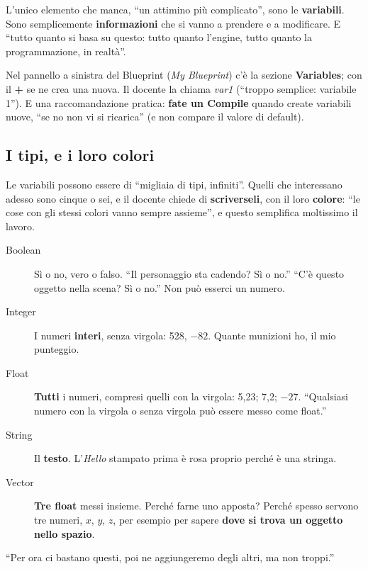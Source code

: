 L'unico elemento che manca, ``un attimino più complicato'', sono le
\textbf{variabili}. Sono semplicemente \textbf{informazioni} che si vanno a
prendere e a modificare. E ``tutto quanto si basa su questo: tutto quanto
l'engine, tutto quanto la programmazione, in realtà''.

Nel pannello a sinistra del Blueprint (\emph{My Blueprint}) c'è la sezione
\textbf{Variables}; con il \textbf{+} se ne crea una nuova. Il docente la
chiama \emph{var1} (``troppo semplice: variabile 1''). E una
raccomandazione pratica: \textbf{fate un Compile} quando create variabili
nuove, ``se no non vi si ricarica'' (e non compare il valore di default).

\subsection{I tipi, e i loro colori}

Le variabili possono essere di ``migliaia di tipi, infiniti''. Quelli che
interessano adesso sono cinque o sei, e il docente chiede di
\textbf{scriverseli}, con il loro \textbf{colore}: ``le cose con gli stessi
colori vanno sempre assieme'', e questo semplifica moltissimo il lavoro.

\begin{description}
  \item[Boolean] Sì o no, vero o falso. ``Il personaggio sta cadendo? Sì o
        no.'' ``C'è questo oggetto nella scena? Sì o no.'' Non può esserci un
        numero.
  \item[Integer] I numeri \textbf{interi}, senza virgola: 528, $-82$. Quante
        munizioni ho, il mio punteggio.
  \item[Float] \textbf{Tutti} i numeri, compresi quelli con la virgola: 5,23;
        7,2; $-27$. ``Qualsiasi numero con la virgola o senza virgola può
        essere messo come float.''
  \item[String] Il \textbf{testo}. L'\emph{Hello} stampato prima è rosa
        proprio perché è una stringa.
  \item[Vector] \textbf{Tre float} messi insieme. Perché farne uno apposta?
        Perché spesso servono tre numeri, $x$, $y$, $z$, per esempio per
        sapere \textbf{dove si trova un oggetto nello spazio}.
\end{description}
``Per ora ci bastano questi, poi ne aggiungeremo degli altri, ma non troppi.''

